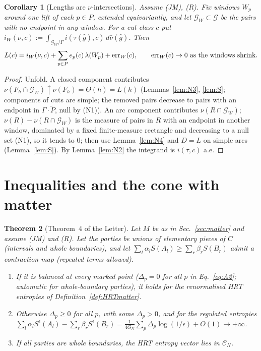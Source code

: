\documentclass[aps,prd,onecolumn,superscriptaddress,nofootinbib,amsmath,amssymb,11pt]{revtex4-2}
\newtheorem{theorem}{Theorem}[section]
\newtheorem{corollary}[theorem]{Corollary}
\theoremstyle{definition}
\newcommand{\CN}{\mathcal{C}_N}
\newcommand{\eps}{\epsilon}
\newcommand{\G}{\mathcal{G}}
\newcommand{\Pt}{\tilde P}
\begin{document}
\begin{corollary}[Lengths are $\nu$-intersections]\label{cor:I}
Assume (JM), (R). Fix windows $W_p$ around one lift of each $p\in P$, extended equivariantly, and let $\G_W\subset\G$ be the pairs
with no endpoint in any window. For a cut class $c$ put $i_W(\nu,c):=\int_{\G_W/\Gamma}i(\tau(\hat g),c)\,d\bar\nu(\hat g)$. Then
\[
L(c)=i_W(\nu,c)+\sum_{p\in P}e_p(c)\,\lambda(W_p)+{\rm err}_W(c),\qquad{\rm err}_W(c)\to0\ \text{as the windows shrink.}
\]
\end{corollary}

\begin{proof}
Unfold. A closed component contributes $\nu(F_h\cap\G_W)\uparrow\nu(F_h)=\Theta(h)=L(h)$ (Lemmas~\ref{lem:N3}, \ref{lem:S};
components of cuts are simple; the removed pairs decrease to pairs with an endpoint in $\Gamma\cdot\Pt$, null by (N1)). An arc
component contributes $\nu(R\cap\G_W)$; $\nu(R)-\nu(R\cap\G_W)$ is the measure of pairs in $R$ with an endpoint in another window,
dominated by a fixed finite-measure rectangle and decreasing to a null set (N1), so it tends to $0$; then use Lemma~\ref{lem:N4}
and $D=L$ on simple arcs (Lemma~\ref{lem:S}). By Lemma~\ref{lem:N2} the integrand is $i(\tau,c)$ a.e.
\end{proof}

\section{Inequalities and the cone with matter}\label{sec:mattermain}

\begin{theorem}[Theorem~4 of the Letter]\label{thm:M}
Let $M$ be as in Sec.~\ref{sec:matter} and assume (JM) and (R). Let the parties be unions of elementary pieces of $C$
(intervals and whole boundaries), and let $\sum_l\alpha_lS(A_l)\ge\sum_r\beta_rS(B_r)$ admit a contraction map (repeated terms
allowed).
\begin{enumerate}
\item[(i)] If it is balanced at every marked point ($\Delta_p=0$ for all $p$ in Eq.~\eqref{eq:A2}; automatic for whole-boundary
parties), it holds for the renormalised HRT entropies of Definition~\ref{def:HRTmatter}.
\item[(ii)] Otherwise $\Delta_p\ge0$ for all $p$, with some $\Delta_p>0$, and for the regulated entropies
$\sum_l\alpha_lS^\eps(A_l)-\sum_r\beta_rS^\eps(B_r)=\frac{1}{4G_N}\sum_p\Delta_p\log(1/\eps)+O(1)\to+\infty$.
\item[(iii)] If all parties are whole boundaries, the HRT entropy vector lies in $\CN$.
\end{enumerate}
\end{theorem}
\end{document}
